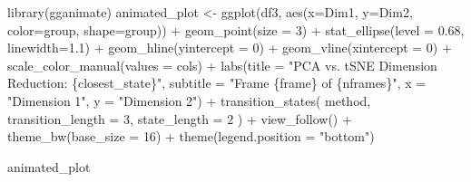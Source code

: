 \documentclass[
  letterpaper,
  10pt,
  krantz2]{krantz}
\makeatletter
\newenvironment{Shaded}{\begin{snugshade}}{\end{snugshade}}
\newcommand{\AttributeTok}[1]{\textcolor[rgb]{0.40,0.45,0.13}{#1}}
\newcommand{\DecValTok}[1]{\textcolor[rgb]{0.68,0.00,0.00}{#1}}
\newcommand{\FloatTok}[1]{\textcolor[rgb]{0.68,0.00,0.00}{#1}}
\newcommand{\FunctionTok}[1]{\textcolor[rgb]{0.28,0.35,0.67}{#1}}
\newcommand{\NormalTok}[1]{\textcolor[rgb]{0.00,0.23,0.31}{#1}}
\newcommand{\OtherTok}[1]{\textcolor[rgb]{0.00,0.23,0.31}{#1}}
\newcommand{\SpecialCharTok}[1]{\textcolor[rgb]{0.37,0.37,0.37}{#1}}
\newcommand{\StringTok}[1]{\textcolor[rgb]{0.13,0.47,0.30}{#1}}
\newenvironment{kframe}{%
  \medskip{}
  \setlength{\fboxsep}{.8em}
  \def\at@end@of@kframe{}%
  \ifinner\ifhmode%
  \def\at@end@of@kframe{\end{minipage}}%
  \begin{minipage}{\columnwidth}%
  \fi\fi%
  \def\FrameCommand##1{\hskip\@totalleftmargin \hskip-\fboxsep
  \colorbox{shadecolor}{##1}\hskip-\fboxsep
      \hskip-\linewidth \hskip-\@totalleftmargin \hskip\columnwidth}%
  \MakeFramed {\advance\hsize-\width
    \@totalleftmargin\z@ \linewidth\hsize
    \@setminipage}}%
{\par\unskip\endMakeFramed%
  \at@end@of@kframe}
\renewenvironment{Shaded}{\begin{kframe}}{\end{kframe}}
\makeatother
\begin{document}
\begin{Shaded}
\begin{Highlighting}[]
\FunctionTok{library}\NormalTok{(gganimate)}
\NormalTok{animated\_plot }\OtherTok{\textless{}{-}} 
  \FunctionTok{ggplot}\NormalTok{(df3, }\FunctionTok{aes}\NormalTok{(}\AttributeTok{x=}\NormalTok{Dim1, }\AttributeTok{y=}\NormalTok{Dim2, }\AttributeTok{color=}\NormalTok{group, }\AttributeTok{shape=}\NormalTok{group)) }\SpecialCharTok{+} 
  \FunctionTok{geom\_point}\NormalTok{(}\AttributeTok{size =} \DecValTok{3}\NormalTok{) }\SpecialCharTok{+} 
  \FunctionTok{stat\_ellipse}\NormalTok{(}\AttributeTok{level =} \FloatTok{0.68}\NormalTok{, }\AttributeTok{linewidth=}\FloatTok{1.1}\NormalTok{) }\SpecialCharTok{+}
  \FunctionTok{geom\_hline}\NormalTok{(}\AttributeTok{yintercept =} \DecValTok{0}\NormalTok{) }\SpecialCharTok{+}
  \FunctionTok{geom\_vline}\NormalTok{(}\AttributeTok{xintercept =} \DecValTok{0}\NormalTok{) }\SpecialCharTok{+}
  \FunctionTok{scale\_color\_manual}\NormalTok{(}\AttributeTok{values =}\NormalTok{ cols) }\SpecialCharTok{+}
  \FunctionTok{labs}\NormalTok{(}\AttributeTok{title =} \StringTok{"PCA vs. tSNE Dimension Reduction: \{closest\_state\}"}\NormalTok{,}
       \AttributeTok{subtitle =} \StringTok{"Frame \{frame\} of \{nframes\}"}\NormalTok{,}
       \AttributeTok{x =} \StringTok{"Dimension 1"}\NormalTok{,}
       \AttributeTok{y =} \StringTok{"Dimension 2"}\NormalTok{) }\SpecialCharTok{+} 
  \FunctionTok{transition\_states}\NormalTok{( method, }\AttributeTok{transition\_length =} \DecValTok{3}\NormalTok{, }\AttributeTok{state\_length =} \DecValTok{2}\NormalTok{ ) }\SpecialCharTok{+} 
  \FunctionTok{view\_follow}\NormalTok{() }\SpecialCharTok{+} 
  \FunctionTok{theme\_bw}\NormalTok{(}\AttributeTok{base\_size =} \DecValTok{16}\NormalTok{) }\SpecialCharTok{+}
  \FunctionTok{theme}\NormalTok{(}\AttributeTok{legend.position =} \StringTok{"bottom"}\NormalTok{) }

\NormalTok{animated\_plot}
\end{Highlighting}
\end{Shaded}
\end{document}
